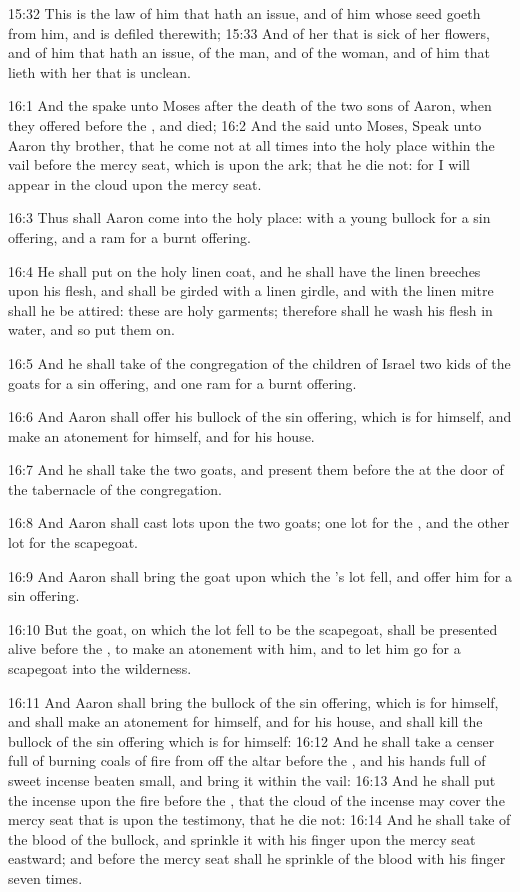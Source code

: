 15:32 This is the law of him that hath an issue, and of him whose seed
goeth from him, and is defiled therewith; 15:33 And of her that is
sick of her flowers, and of him that hath an issue, of the man, and of
the woman, and of him that lieth with her that is unclean.

16:1 And the \LORD spake unto Moses after the death of the two sons of
Aaron, when they offered before the \LORD, and died; 16:2 And the \LORD
said unto Moses, Speak unto Aaron thy brother, that he come not at all
times into the holy place within the vail before the mercy seat, which
is upon the ark; that he die not: for I will appear in the cloud upon
the mercy seat.

16:3 Thus shall Aaron come into the holy place: with a young bullock
for a sin offering, and a ram for a burnt offering.

16:4 He shall put on the holy linen coat, and he shall have the linen
breeches upon his flesh, and shall be girded with a linen girdle, and
with the linen mitre shall he be attired: these are holy garments;
therefore shall he wash his flesh in water, and so put them on.

16:5 And he shall take of the congregation of the children of Israel
two kids of the goats for a sin offering, and one ram for a burnt
offering.

16:6 And Aaron shall offer his bullock of the sin offering, which is
for himself, and make an atonement for himself, and for his house.

16:7 And he shall take the two goats, and present them before the \LORD
at the door of the tabernacle of the congregation.

16:8 And Aaron shall cast lots upon the two goats; one lot for the
\LORD, and the other lot for the scapegoat.

16:9 And Aaron shall bring the goat upon which the \LORD's lot fell,
and offer him for a sin offering.

16:10 But the goat, on which the lot fell to be the scapegoat, shall
be presented alive before the \LORD, to make an atonement with him, and
to let him go for a scapegoat into the wilderness.

16:11 And Aaron shall bring the bullock of the sin offering, which is
for himself, and shall make an atonement for himself, and for his
house, and shall kill the bullock of the sin offering which is for
himself: 16:12 And he shall take a censer full of burning coals of
fire from off the altar before the \LORD, and his hands full of sweet
incense beaten small, and bring it within the vail: 16:13 And he shall
put the incense upon the fire before the \LORD, that the cloud of the
incense may cover the mercy seat that is upon the testimony, that he
die not: 16:14 And he shall take of the blood of the bullock, and
sprinkle it with his finger upon the mercy seat eastward; and before
the mercy seat shall he sprinkle of the blood with his finger seven
times.

